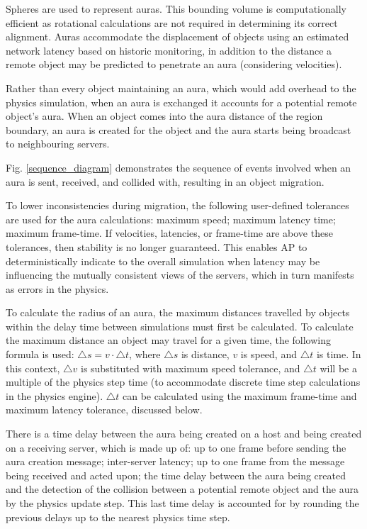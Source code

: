 Spheres are used to represent auras. This bounding volume is computationally efficient as rotational calculations are not required in determining its correct alignment. Auras accommodate the displacement of objects using an estimated network latency based on historic monitoring, in addition to the distance a remote object may be predicted to penetrate an aura (considering velocities).

Rather than every object maintaining an aura, which would add overhead to the physics simulation, when an aura is exchanged it accounts for a potential remote object's aura. When an object comes into the aura distance of the region boundary, an aura is created for the object and the aura starts being broadcast to neighbouring servers.

Fig. \ref{sequence_diagram} demonstrates the sequence of events involved when an aura is sent, received, and collided with, resulting in an object migration.

To lower inconsistencies during migration, the following user-defined tolerances are used for the aura calculations: maximum speed; maximum latency time; maximum frame-time. If velocities, latencies, or frame-time are above these tolerances, then stability is no longer guaranteed. This enables AP to deterministically indicate to the overall simulation when latency may be influencing the mutually consistent views of the servers, which in turn manifests as errors in the physics.

To calculate the radius of an aura, the maximum distances travelled by objects within the delay time between simulations must first be calculated. To calculate the maximum distance an object may travel for a given time, the following formula is used: $\triangle s=v\cdot \triangle t$, where $ \triangle s$ is distance, $v$ is speed, and $ \triangle t$ is time. In this context, $ \triangle v$ is substituted with maximum speed tolerance, and $ \triangle t$ will be a multiple of the physics step time (to accommodate discrete time step calculations in the physics engine). $ \triangle t$ can be calculated using the maximum frame-time and maximum latency tolerance, discussed below.

There is a time delay between the aura being created on a host and being created on a receiving server, which is made up of: up to one frame before sending the aura creation message; inter-server latency; up to one frame from the message being received and acted upon; the time delay between the aura being created and the detection of the collision between a potential remote object and the aura by the physics update step. This last time delay is accounted for by rounding the previous delays up to the nearest physics time step.

